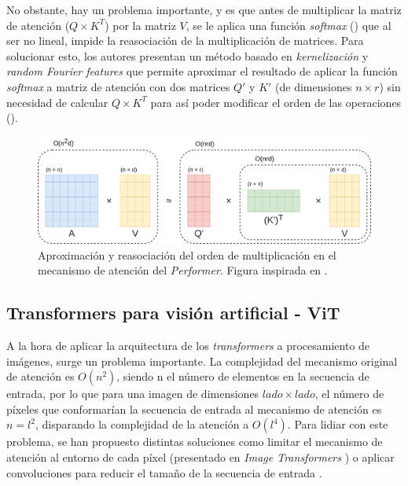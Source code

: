 No obstante, hay un problema importante, y es que antes de multiplicar la matriz de atención ($Q \times K^T$) por la matriz $V$, se le aplica una función \textit{softmax} () que al ser no lineal, impide la reasociación de la multiplicación de matrices. Para solucionar esto, los autores presentan un método basado en \textit{kernelización} y \textit{random Fourier features} que permite aproximar el resultado de aplicar la función \textit{softmax} a matriz de atención con dos matrices $Q'$ y $K'$ (de dimensiones $n \times r$) sin necesidad de calcular $Q \times K^T$ para así poder modificar el orden de las operaciones (). 

\vspace{-3mm}

\begin{figure}[H]
\centering
\includegraphics[width=1\linewidth]{imagenes/performer2.png} 
\captionsetup{width=1\linewidth}
\caption{Aproximación y reasociación del orden de multiplicación en el mecanismo de atención del \textit{Performer}. Figura inspirada en \cite{performers}.}
\label{fig:performer}
\end{figure}


\subsection{Transformers para visión artificial - ViT}
A la hora de aplicar la arquitectura de los \textit{transformers} a procesamiento de imágenes, surge un problema importante. La complejidad del mecanismo original de atención es $O(n^{2})$, siendo n el número de elementos en la secuencia de entrada, por lo que para una imagen de dimensiones $lado \times lado$, el número de píxeles que conformarían la secuencia de entrada al mecanismo de atención es $n = l^2$, disparando la complejidad de la atención a $O(l^{4})$. Para lidiar con este problema, se han propuesto distintas soluciones como limitar el mecanismo de atención al entorno de cada píxel (presentado en \textit{Image Transformers} \cite{image_transformer}) o aplicar convoluciones para reducir el tamaño de la secuencia de entrada \cite{detrfacebookdetectiontransformers}. 

